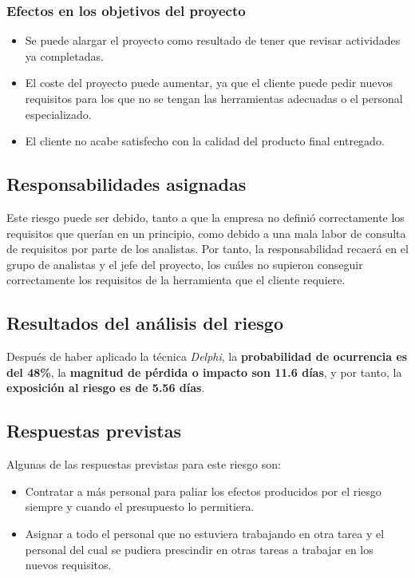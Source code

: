 \documentclass[11pt,a4paper,spanish,twoside]{book}
\begin{document}
\subsubsection{Efectos en los objetivos del proyecto}
\begin{itemize}
\item Se puede alargar el proyecto como resultado de tener que revisar 
  actividades ya completadas.
\item El coste del proyecto puede aumentar, ya que el cliente puede pedir 
  nuevos requisitos para los que no se tengan las herramientas adecuadas o el 
  personal especializado.
\item El cliente no acabe satisfecho con la calidad del producto final
  entregado.
\end{itemize}

\subsection{Responsabilidades asignadas}
Este riesgo puede ser debido, tanto a que la empresa no definió correctamente
los requisitos que querían en un principio, como debido a una mala labor de
consulta de requisitos por parte de los analistas. Por tanto, la
responsabilidad recaerá en el grupo de analistas y el jefe del proyecto, los
cuáles no supieron conseguir correctamente los requisitos de la herramienta
que el cliente requiere.

\subsection{Resultados del análisis del riesgo}
Después de haber aplicado la técnica \emph{Delphi}, la \textbf{probabilidad de
ocurrencia es del 48\%}, la \textbf{magnitud de pérdida o impacto son 11.6
días}, y por tanto, la \textbf{exposición al riesgo es de 5.56 días}.

\subsection{Respuestas previstas}
Algunas de las respuestas previstas para este riesgo son:
\begin{itemize}
\item Contratar a más personal para paliar los efectos producidos por el
  riesgo siempre y cuando el presupuesto lo permitiera.
\item Asignar a todo el personal que no estuviera trabajando en otra tarea y
  el personal del cual se pudiera prescindir en otras tareas a trabajar en los 
  nuevos requisitos.
\end{itemize}
\end{document}
